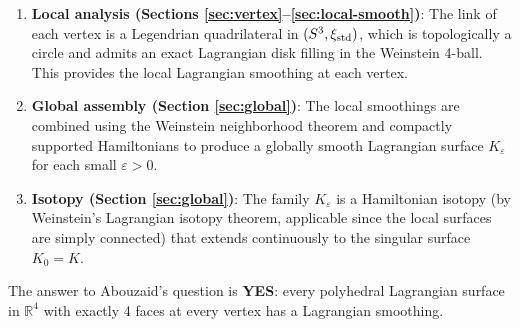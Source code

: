 \documentclass[12pt]{article}
\newcommand{\bR}{\mathbb{R}}
\newcommand{\eps}{\varepsilon}
\begin{document}
\begin{enumerate}
  \item \textbf{Local analysis (Sections \ref{sec:vertex}--\ref{sec:local-smooth})}: The link of each vertex is a Legendrian quadrilateral in $(S^3, \xi_{\rm std})$, which is topologically a circle and admits an exact Lagrangian disk filling in the Weinstein 4-ball. This provides the local Lagrangian smoothing at each vertex.

  \item \textbf{Global assembly (Section \ref{sec:global})}: The local smoothings are combined using the Weinstein neighborhood theorem and compactly supported Hamiltonians to produce a globally smooth Lagrangian surface $K_\eps$ for each small $\eps > 0$.

  \item \textbf{Isotopy (Section \ref{sec:global})}: The family $K_\eps$ is a Hamiltonian isotopy (by Weinstein's Lagrangian isotopy theorem, applicable since the local surfaces are simply connected) that extends continuously to the singular surface $K_0 = K$.

\end{enumerate}

The answer to Abouzaid's question is \textbf{YES}: every polyhedral Lagrangian surface in $\bR^4$ with exactly 4 faces at every vertex has a Lagrangian smoothing.
\end{document}
